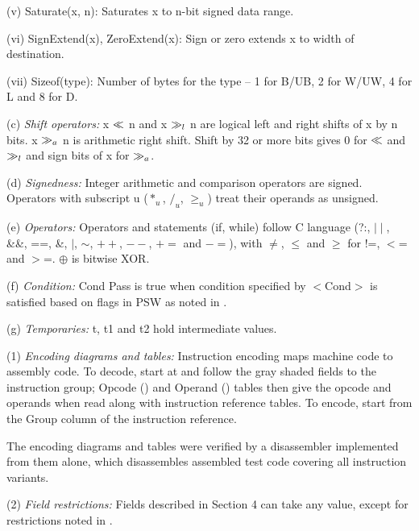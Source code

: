         (v) Saturate(x, n): Saturates x to n-bit signed data range.

        (vi) SignExtend(x), ZeroExtend(x): Sign or zero extends x to width of destination.

        (vii) Sizeof(type): Number of bytes for the type -- 1 for B/UB, 2 for W/UW, 4 for L and
        8 for D.

    \leveltwo
    (c) \emph{Shift operators:} %
    x $\ll$ n and x $\gg_l$ n are logical left and right shifts of x by n bits. x $\gg_a$ n is 
    arithmetic right shift. Shift by 32 or more bits gives 0 for $\ll$ and $\gg_l$ and sign 
    bits of x for $\gg_a$.

    (d) \emph{Signedness:} %
    Integer arithmetic and comparison operators are signed. Operators with subscript u ($*_u$, 
    $/_u$, $\ge_u$) treat their operands as unsigned.

    (e) \emph{Operators:} %
    Operators and statements (if, while) follow C language (?:, $\mid\mid$, \&\&, ==, \&, $\mid$, 
    $\sim$, $++$, $--$, $+=$ and $-=$), with $\ne$, $\le$ and $\ge$ for !=, $<$= and $>$=. $\oplus$ is 
    bitwise XOR.

    (f) \emph{Condition:} %
    Cond Pass is true when condition specified by $<$Cond$>$ is satisfied based on flags in PSW
    as noted in .

    (g) \emph{Temporaries:} %
    t, t1 and t2 hold intermediate values.



\SOPNoteBody

(1) \emph{Encoding diagrams and tables:} %
Instruction encoding maps machine code to assembly code. To decode, start at 
 and follow the gray shaded fields to the instruction group; Opcode 
() and Operand 
() tables then give the opcode and operands when read
along with instruction reference tables. To encode, start from the Group column of the instruction reference.

The encoding diagrams and tables were verified by a disassembler implemented from them alone, which disassembles 
assembled test code covering all instruction variants.

(2) \emph{Field restrictions:} %
Fields described in Section 4 can take any value, except for restrictions noted in 
.

